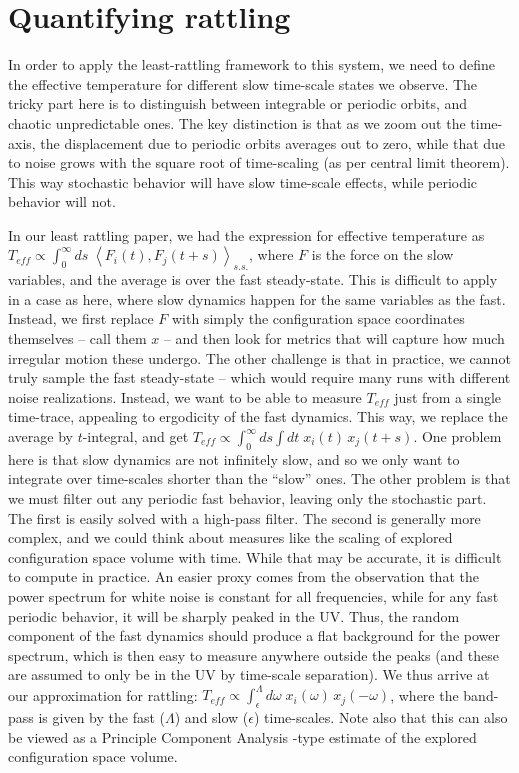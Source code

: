 \documentclass[reprint,prx]{revtex4-1}
\renewcommand{\=}[1]{\stackrel{#1}{=}} %
\renewcommand{\(}{\left (}
\renewcommand{\)}{\right  )}
\renewcommand{\[}{\left [}
\renewcommand{\]}{\right ]}
\newcommand{\<}{\left <}
\renewcommand{\>}{\right >}
\theoremstyle{definition}
\theoremstyle{remark}
\renewcommand{\inf}{\infty}
\begin{document}
\section{Quantifying rattling}
In order to apply the least-rattling framework to this system, we need to define the effective temperature for different slow time-scale states we observe. The tricky part here is to distinguish between integrable or periodic orbits, and chaotic unpredictable ones. The key distinction is that as we zoom out the time-axis, the displacement due to periodic orbits averages out to zero, while that due to noise grows with the square root of time-scaling (as per central limit theorem). This way stochastic behavior will have slow time-scale effects, while periodic behavior will not. 

In our least rattling paper, we had the expression for effective temperature as $ T_{eff}\propto \int_0^\inf ds\;\<F_i(t),F_j(t+s)\>_{s.s.} $, where $ F $ is the force on the slow variables, and the average is over the fast steady-state. This is difficult to apply in a case as here, where slow dynamics happen for the same variables as the fast. Instead, we first replace $ F $ with simply the configuration space coordinates themselves -- call them $ x $ -- and then look for metrics that will capture how much irregular motion these undergo. The other challenge is that in practice, we cannot truly sample the fast steady-state -- which would require many runs with different noise realizations. Instead, we want to be able to measure $ T_{eff} $ just from a single time-trace, appealing to ergodicity of the fast dynamics. This way, we replace the average by $ t $-integral, and get $ T_{eff} \propto \int_0^\inf ds\int dt\;x_i(t)\,x_j(t+s) $. One problem here is that slow dynamics are not infinitely slow, and so we only want to integrate over time-scales shorter than the ``slow'' ones. The other problem is that we must filter out any periodic fast behavior, leaving only the stochastic part. The first is easily solved with a high-pass filter. The second is generally more complex, and we could think about measures like the scaling of explored configuration space volume with time. While that may be accurate, it is difficult to compute in practice. An easier proxy comes from the observation that the power spectrum for white noise is constant for all frequencies, while for any fast periodic behavior, it will be sharply peaked in the UV. Thus, the random component of the fast dynamics should produce a flat background for the power spectrum, which is then easy to measure anywhere outside the peaks (and these are assumed to only be in the UV by time-scale separation). We thus arrive at our approximation for rattling: $ T_{eff} \propto \int_{\epsilon}^{\Lambda} d\omega\; x_i(\omega)\,x_j(-\omega)$, where the band-pass is given by the fast ($ \Lambda $) and slow ($ \epsilon $) time-scales. Note also that this can also be viewed as a Principle Component Analysis -type estimate of the explored configuration space volume.
\end{document}
